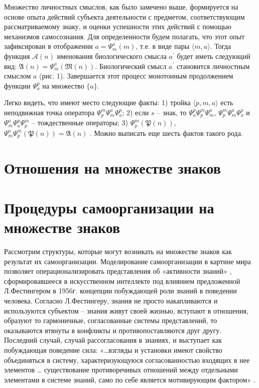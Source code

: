 Множество личностных смыслов, как было замечено выше, формируется на основе опыта действий субъекта деятельности с предметом, соответствующим рассматриваемому знаку, и оценки успешности этих действий с помощью механизмов самосознания. Для определенности будем полагать, что этот опыт зафиксирован в отображении $a=\Psi_m^a(m)$, т.е. в виде пары $\langle m,a\rangle$. Тогда функция $\mathcal A(n)$ именования биологического смысла $a^\prime$ будет иметь следующий вид: $\mathfrak A(n)=\Psi_m^a(\mathfrak M(n))$. Биологический смысл $a^\prime$ становится личностным смыслом $a$ (рис. 1). Завершается этот процесс монотонным продолжением функции $\Psi_a^p$ на множество $\{a\}$.

Легко видеть, что имеют место следующие факты:
1) тройка $\langle p,m,a\rangle$ есть неподвижная точка оператора $\Psi_p^m\Psi_m^a\Psi_a^p$;
2) если $s$ – знак, то  $\Psi_a^p\Psi_p^m\Psi_m^a$, $\Psi_p^m\Psi_m^a\Psi_a^p$ и $\Psi_m^a\Psi_a^p\Psi_p^m$ – тождественные операторы;
3) $\Psi_p^m(\mathfrak P(n))$, $\Psi_m^a\Psi_p^m(\mathfrak P(n))=\mathfrak A(n)$ .
Можно выписать еще шесть фактов такого рода.


\section{Отношения на множестве знаков} \label{sect2_3}

\section{Процедуры самоорганизации на множестве знаков} \label{sect2_4}

Рассмотрим структуры, которые могут возникать на множестве знаков как результат их самоорганизации. Моделирование самоорганизации в картине мира позволяет операционализировать представления об «активности знаний» \cite{Pospelov2002}, сформировавшееся в искусственном интеллекте под влиянием предложенной Л.Фестингером в 1956г. концепции побуждающей роли знаний в поведении человека. Согласно Л.Фестингеру, знания не просто накапливаются и используются субъектом – знания живут своей жизнью, вступают в отношения, образуют то гармоничные, согласованные системы представлений, то оказываются втянуты в конфликты и противопоставляются друг другу. Последний случай, случай рассогласования в знаниях, и выступает как побуждающая поведение сила: «…взгляды и установки имеют свойство объединяться в систему, характеризующуюся согласованностью входящих в нее элементов … существование противоречивых отношений между отдельными элементами в системе знаний, само по себе является мотивирующим фактором» \cite{Festinger1999}.

